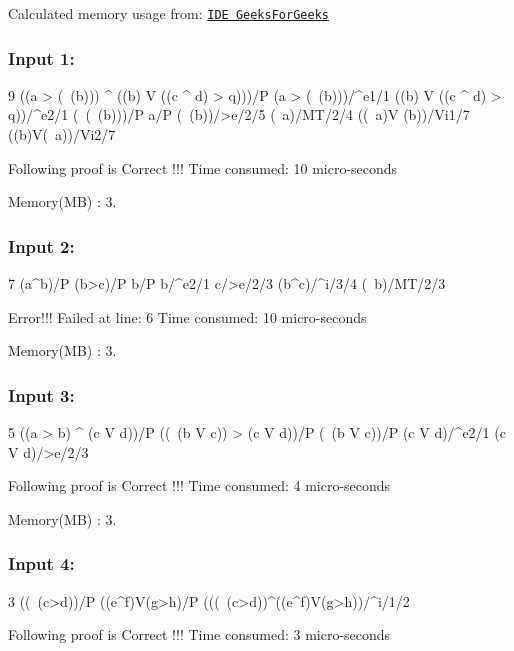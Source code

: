 Calculated memory usage from\+: \href{https://ide.geeksforgeeks.org/}{\tt I\+DE Geeks\+For\+Geeks}

\subsubsection*{Input 1\+:}


\begin{DoxyCode}
9
((a > (~(b))) ^ ((b) V ((c ^ d) > q)))/P
(a > (~(b)))/^e1/1
((b) V ((c ^ d) > q))/^e2/1
(~(~(b)))/P
a/P
(~(b))/>e/2/5
(~a)/MT/2/4
((~a)V (b))/Vi1/7
((b)V(~a))/Vi2/7

Following proof is Correct !!!
Time consumed: 10 micro-seconds
\end{DoxyCode}


Memory(\+M\+B) \+: 3.

\subsubsection*{Input 2\+:}


\begin{DoxyCode}
 7
(a^b)/P
(b>c)/P
b/P
b/^e2/1
c/>e/2/3
(b^c)/^i/3/4
(~b)/MT/2/3


Error!!! 
Failed at line: 6
Time consumed: 10 micro-seconds
\end{DoxyCode}


Memory(\+M\+B) \+: 3.

\subsubsection*{Input 3\+:}


\begin{DoxyCode}
5
((a > b) ^ (c V d))/P
((~(b V c)) > (c V d))/P
(~(b V c))/P
(c V d)/^e2/1
(c V d)/>e/2/3


Following proof is Correct !!!
Time consumed: 4 micro-seconds
\end{DoxyCode}


Memory(\+M\+B) \+: 3.

\subsubsection*{Input 4\+:}


\begin{DoxyCode}
3
((~(c>d))/P
((e^f)V(g>h)/P
(((~(c>d))^((e^f)V(g>h))/^i/1/2


Following proof is Correct !!!
Time consumed: 3 micro-seconds
\end{DoxyCode}


